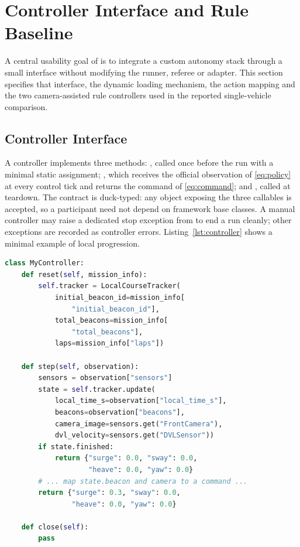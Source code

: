\section{Controller Interface and Rule Baseline}
\label{sec:controller}

A central usability goal of \mra{} is to integrate a custom autonomy stack through a small interface without modifying the runner, referee or adapter. This section specifies that interface, the dynamic loading mechanism, the action mapping and the two camera-assisted rule controllers used in the reported single-vehicle comparison.

\subsection{Controller Interface}

A controller implements three methods: , called once before the run with a minimal static assignment; , which receives the official observation of \eqref{eq:policy} at every control tick and returns the command of \eqref{eq:command}; and , called at teardown. The contract is duck-typed: any object exposing the three callables is accepted, so a participant need not depend on framework base classes. A manual controller may raise a dedicated stop exception from  to end a run cleanly; other exceptions are recorded as controller errors. Listing~\ref{lst:controller} shows a minimal example of local progression.

\begin{lstlisting}[language=Python, caption={Minimal custom controller.}, label={lst:controller}]
class MyController:
    def reset(self, mission_info):
        self.tracker = LocalCourseTracker(
            initial_beacon_id=mission_info[
                "initial_beacon_id"],
            total_beacons=mission_info[
                "total_beacons"],
            laps=mission_info["laps"])

    def step(self, observation):
        sensors = observation["sensors"]
        state = self.tracker.update(
            local_time_s=observation["local_time_s"],
            beacons=observation["beacons"],
            camera_image=sensors.get("FrontCamera"),
            dvl_velocity=sensors.get("DVLSensor"))
        if state.finished:
            return {"surge": 0.0, "sway": 0.0,
                    "heave": 0.0, "yaw": 0.0}
        # ... map state.beacon and camera to a command ...
        return {"surge": 0.3, "sway": 0.0,
                "heave": 0.0, "yaw": 0.0}

    def close(self):
        pass
\end{lstlisting}

